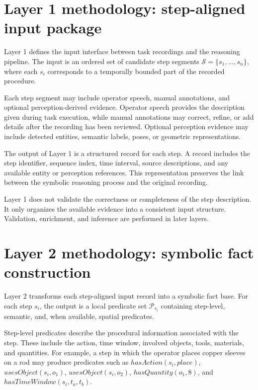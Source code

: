 \section{Layer 1 methodology: step-aligned input package}
\label{sec:layer1-method}

Layer 1 defines the input interface between task recordings and the reasoning pipeline. The input is an ordered set of candidate step segments $\mathcal{S} = \{s_1,\ldots,s_n\}$, where each $s_i$ corresponds to a temporally bounded part of the recorded procedure.

Each step segment may include operator speech, manual annotations, and optional perception-derived evidence. Operator speech provides the description given during task execution, while manual annotations may correct, refine, or add details after the recording has been reviewed. Optional perception evidence may include detected entities, semantic labels, poses, or geometric representations.

The output of Layer 1 is a structured record for each step. A record includes the step identifier, sequence index, time interval, source descriptions, and any available entity or perception references. This representation preserves the link between the symbolic reasoning process and the original recording.

Layer 1 does not validate the correctness or completeness of the step description. It only organizes the available evidence into a consistent input structure. Validation, enrichment, and inference are performed in later layers.


\section{Layer 2 methodology: symbolic fact construction}
\label{sec:layer2-method}

Layer 2 transforms each step-aligned input record into a symbolic fact base. For each step $s_i$, the output is a local predicate set $\mathcal{P}_{s_i}$ containing step-level, semantic, and, when available, spatial predicates.

Step-level predicates describe the procedural information associated with the step. These include the action, time window, involved objects, tools, materials, and quantities. For example, a step in which the operator places copper sleeves on a rod may produce predicates such as $hasAction(s_i,place)$, $usesObject(s_i,o_1)$, $usesObject(s_i,o_2)$, $hasQuantity(o_1,8)$, and $hasTimeWindow(s_i,t_a,t_b)$.

